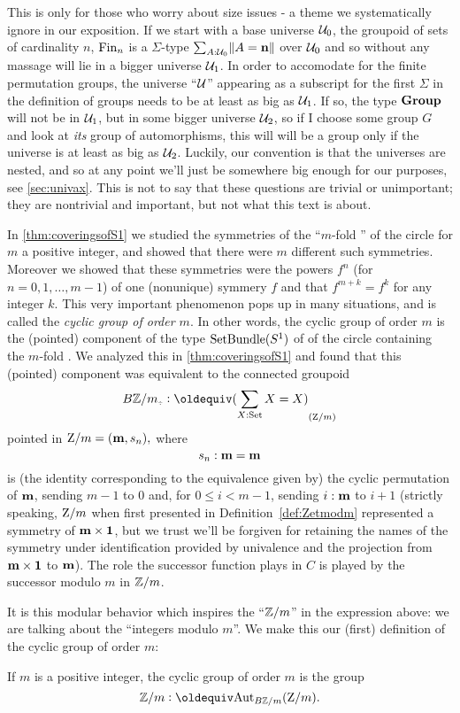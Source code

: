 \begin{remark}
  \label{rem:groupsarebig}
  This is only for those who worry about size issues - a theme we systematically ignore in our exposition.  If we start with a base universe $\mathcal{U}_0$, the groupoid of sets of cardinality $n$, $\operatorname{Fin}_n$ is a $\Sigma$-type $\sum_{A:\mathcal{U}_0}\lVert A=\mathbf{n}\rVert$ over $\mathcal{U}_0$ and so without any massage will lie in a bigger universe $\mathcal{U}_1$.  In order to accomodate for the finite permutation groups, the universe ``$\mathcal{U}$'' appearing as a subscript for the first $\Sigma$ in the definition of groups needs to be at least as big as $\mathcal{U}_1$.  If so, the type $\mathbf{Group}$ will not be in $\mathcal{U}_1$, but in some bigger universe $\mathcal{U}_2$, so if I choose some group $G$ and look at \emph{its} group of automorphisms, this will will be a group only if the universe is at least as big as $\mathcal{U}_2$.  Luckily, our convention is that the universes are nested, and so at any point we'll just be somewhere big enough for our purposes, see \cref{sec:univax}.  This is not to say that these questions are trivial or unimportant; they are nontrivial and important, but not what this text is about.
\end{remark}

\begin{example}\label{ex:cyclicgroups}
In \cref{thm:coveringsofS1} we studied the symmetries of the ``$m$-fold \covering'' 
of the circle for $m$ a positive integer, and showed that there were $m$ different
such symmetries. Moreover we showed that these symmetries were the powers $f^n$ (for $n=0,1,\dots,m-1$)
of one (nonunique) symmery $f$ and that $f^{m+k}=f^k$ for any integer $k$.
This very important phenomenon pops up in many situations, 
and is called the \emph{cyclic group of order $m$}.
In other words, the cyclic group of order $m$ is the (pointed) component of the type $\operatorname{\mathrm{SetBundle}}({S^1})$ of \coverings of the circle containing the $m$-fold \covering.
We analyzed this in \cref{thm:coveringsofS1} and found that this (pointed) component was equivalent to the connected groupoid
$$B\ZZ/m_\div\defequi\conncomp{(\sum_{X:\Set}X=X)}{\zet/m}$$
pointed in $\mathrm{Z}/m = (\mathbf{m},s_n),$
where 
$$s_n :\mathbf{m}=\mathbf{m}$$ is (the identity corresponding to the equivalence given by) 
the cyclic permutation of $\mathbf{m}$, sending $m-1$ to $0$ and, 
for $0\leq i<m-1$, sending $i:\mathbf{m}$ to $i+1$ (strictly speaking, $\mathrm{Z}/m$ when first presented in Definition~\ref{def:Zetmodm} represented a symmetry of $\mathbf{m}\times\mathbf{1}$, but we trust we'll be forgiven for retaining the names of the symmetry under identification provided by univalence and the projection from $\mathbf{m}\times \mathbf{1}$ to $\mathbf{m}$). The role
the successor function plays in $C$ is played by the successor modulo $m$ in $\mathbb{Z}/m$. 

It is this modular behavior which inspires the ``$\mathbb{Z}/m$'' in the expression above: we are talking about the ``integers modulo $m$''.
We make this our (first) definition of the cyclic group of order $m$:
\end{example}
\begin{definition}\label{def:Z/mgroup}
  If $m$ is a positive integer, the cyclic group of order $m$ is the group
  $$\ZZ/m\defequi\aut_{B\ZZ/m}(\zet/m).$$
\end{definition}


